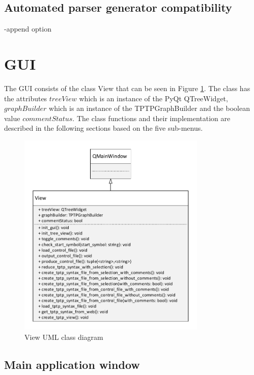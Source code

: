 \subsection{Automated parser generator compatibility}\label{sec:ImplementationAutomatedParserGenerator}
-append option

\section{GUI}\label{sec:ImplementationGUI}
The GUI consists of the class View that can be seen in Figure \ref{fig:ImplementationViewClassDiagram}. The class has the attributes $treeView$ which is an instance of the PyQt QTreeWidget, $graphBuilder$ which is an instance of the TPTPGraphBuilder and the boolean value $commentStatus$. The class functions and their implementation are described in the following sections based on the five sub-menus.

\begin{figure}[H]
\centering
\includegraphics[width=0.8\textwidth]{images/Implementation_view_class_diagramm.pdf}
\caption{View UML class diagram}
\label{fig:ImplementationViewClassDiagram}
\end{figure}

\subsection{Main application window}\label{sec:ImplementationGUIMainAppli}

